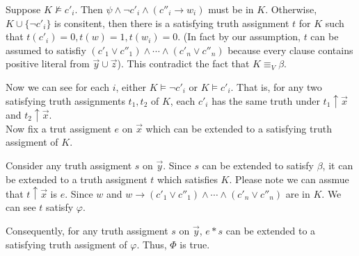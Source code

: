 \documentclass[12pt]{article}
\begin{document}
Suppose $K\not\models c'_i$. Then $\psi\wedge\neg c'_i \wedge (c''_i\rightarrow w_i)$ must be in $K$. 
Otherwise, $K\cup\{\neg c'_i\}$ is consitent,  then there is a satisfying truth assignment $t$ for $K$ such that $t(c'_i)=0, t(w)=1, t(w_i)=0$. (In fact by our assumption, $t$ can be assumed to satisfiy $(c'_1\vee c''_1)\wedge\cdots\wedge (c'_n\vee c''_n)$ because every clause contains positive literal from $\vec{y}\cup\vec{z}$). This contradict the fact that $K\equiv_V\beta$.


Now we can see for each $i$, either $K\models \neg c'_i$ or $K\models c'_i$. 
That is, for any two satisfying truth assignments $t_1, t_2$ of $K$, each $c'_i$ has the same truth under $t_1\uparrow \vec{x}$ and $t_2\uparrow\vec{x}$.  \\





Now fix a trut assigment $e$ on $\vec{x}$ which can be extended to a satisfying truth assigment of $K$. 

Consider any truth assigment $s$ on $\vec{y}$. Since $s$ can be extended to satisfy $\beta$, it can be extended to a truth assigment $t$ which satisfies $K$. Please note we can assmue that $t\uparrow\vec{x}$ is $e$. 
Since $w$ and $w\rightarrow (c'_1\vee c''_1)\wedge\cdots\wedge (c'_n\vee c''_n)$ are in $K$. We can see $t$ satisfy $\varphi$. 

Consequently, for any truth assigment $s$ on $\vec{y}$, $e*s$ can be extended to a satisfying truth assigment of $\varphi$. Thus, $\Phi$ is true.


\ \\ 
\end{document}
